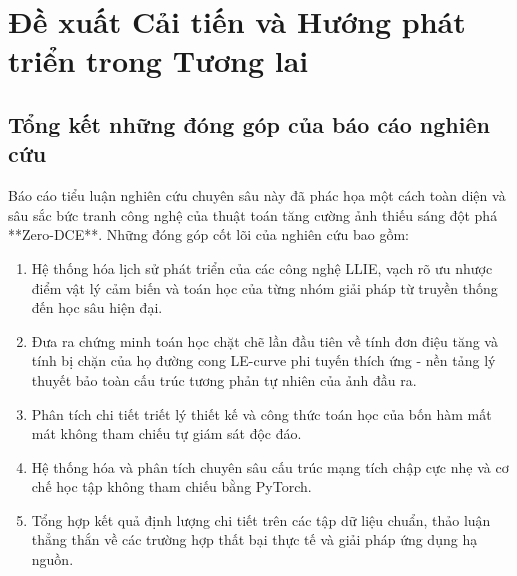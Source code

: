 \documentclass[a4paper]{article}
\begin{document}
\clearpage

\section{Đề xuất Cải tiến và Hướng phát triển trong Tương lai}

\subsection{Tổng kết những đóng góp của báo cáo nghiên cứu}
Báo cáo tiểu luận nghiên cứu chuyên sâu này đã phác họa một cách toàn diện và sâu sắc bức tranh công nghệ của thuật toán tăng cường ảnh thiếu sáng đột phá **Zero-DCE**. Những đóng góp cốt lõi của nghiên cứu bao gồm:
\begin{enumerate}
    \item Hệ thống hóa lịch sử phát triển của các công nghệ LLIE, vạch rõ ưu nhược điểm vật lý cảm biến và toán học của từng nhóm giải pháp từ truyền thống đến học sâu hiện đại.
    \item Đưa ra chứng minh toán học chặt chẽ lần đầu tiên về tính đơn điệu tăng và tính bị chặn của họ đường cong LE-curve phi tuyến thích ứng - nền tảng lý thuyết bảo toàn cấu trúc tương phản tự nhiên của ảnh đầu ra.
    \item Phân tích chi tiết triết lý thiết kế và công thức toán học của bốn hàm mất mát không tham chiếu tự giám sát độc đáo.
    \item Hệ thống hóa và phân tích chuyên sâu cấu trúc mạng tích chập cực nhẹ và cơ chế học tập không tham chiếu bằng PyTorch.
    \item Tổng hợp kết quả định lượng chi tiết trên các tập dữ liệu chuẩn, thảo luận thẳng thắn về các trường hợp thất bại thực tế và giải pháp ứng dụng hạ nguồn.
\end{enumerate}
\end{document}
